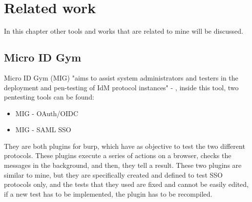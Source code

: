 \chapter{Related work}
In this chapter other tools and works that are related to mine will be discussed.

\section{Micro ID Gym}
Micro ID Gym (MIG) "aims to assist system administrators and testers in the deployment and pen-testing of IdM protocol instances" - \cite{micro_id_gym}, inside this tool, two pentesting tools can be found:
\begin{itemize}
    \item MIG - OAuth/OIDC \cite{claudio_grisenti}
    \item MIG - SAML SSO \cite{stefano_facchini}
\end{itemize}
They are both plugins for \Gls{burp}, which have as objective to test the two different protocols. These plugins execute a series of actions on a browser, checks the messages in the background, and then, they tell a result.
These two plugins are similar to mine, but they are specifically created and defined to test SSO protocols only, and the tests that they used are fixed and cannot be easily edited, if a new test has to be implemented, the plugin has to be recompiled.

